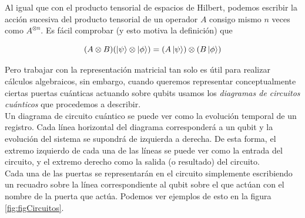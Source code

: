 \documentclass[11pt, spanish]{report}
\numberwithin{equation}{section}
\numberwithin{defin}{section}
\begin{document}

Al igual que con el producto tensorial de espacios de Hilbert, podemos escribir la acción sucesiva del producto tensorial de un operador $A$ consigo mismo $n$ veces como $A^{\otimes n}$. Es fácil comprobar (y esto motiva la definición) que 

\begin{equation}
(A\otimes B)(\ket{\psi}\otimes\ket{\phi})=(A\ket{\psi})\otimes(B\ket{\phi})
\end{equation}

Pero trabajar con la representación matricial tan solo es útil para realizar cálculos algebraicos, sin embargo, cuando queremos representar conceptualmente ciertas puertas cuánticas actuando sobre qubits usamos los \emph{diagramas de circuitos cuánticos} que procedemos a describir.\\

Un diagrama de circuito cuántico se puede ver como la evolución temporal de un registro. Cada línea horizontal del diagrama corresponderá a un qubit y la evolución del sistema se supondrá de izquierda a derecha. De esta forma, el extremo izquierdo de cada una de las líneas se puede ver como la entrada del circuito, y el extremo derecho como la salida (o resultado) del circuito.\\

Cada una de las puertas se representarán en el circuito simplemente escribiendo un recuadro sobre la línea correspondiente al qubit sobre el que actúan con el nombre de la puerta que actúa. Podemos ver ejemplos de esto en la figura \ref{fig:figCircuitos}.\\

\end{document}
